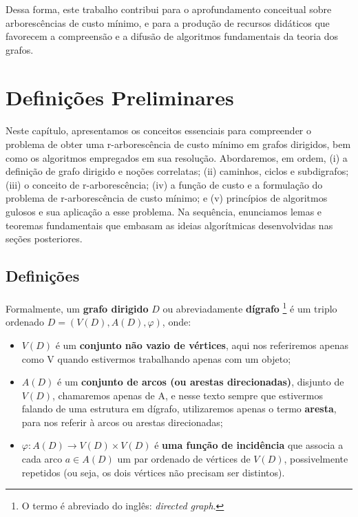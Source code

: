 \documentclass[12pt,a4paper]{article}
\begin{document}
Dessa forma, este trabalho contribui para o aprofundamento conceitual sobre arborescências de custo mínimo, e para a produção de recursos didáticos que favorecem a compreensão e a difusão de algoritmos fundamentais da teoria dos grafos.

\section{Definições Preliminares}
\paragraph{}
Neste capítulo, apresentamos os conceitos essenciais para compreender o problema de obter uma r-arborescência de custo mínimo em grafos dirigidos, bem como os algoritmos empregados em sua resolução. Abordaremos, em ordem, (i) a definição de grafo dirigido e noções correlatas; (ii) caminhos, ciclos e subdigrafos; (iii) o conceito de r-arborescência; (iv) a função de custo e a formulação do problema de r-arborescência de custo mínimo; e (v) princípios de algoritmos gulosos e sua aplicação a esse problema. Na sequência, enunciamos lemas e teoremas fundamentais que embasam as ideias algorítmicas desenvolvidas nas seções posteriores.

\subsection{Definições}
\paragraph{}
Formalmente, um \textbf{grafo dirigido} \(D\) ou abreviadamente \textbf{dígrafo} 
\footnote{O termo é abreviado do inglês: \textit{directed graph}.} é um triplo ordenado \(D = (V(D), A(D), \varphi)\), onde:
\begin{itemize}
    \item \(V(D)\) é um \textbf{conjunto não vazio de vértices}, aqui nos referiremos apenas como V quando estivermos trabalhando apenas com um objeto;
    \item \(A(D)\) é um \textbf{conjunto de arcos (ou arestas direcionadas)}, disjunto de \(V(D)\), chamaremos apenas de A, e nesse texto sempre que estivermos falando de uma estrutura em dígrafo, utilizaremos apenas o termo \textbf{aresta}, para nos referir à arcos ou arestas direcionadas;
    \item \(\varphi: A(D) \to V(D) \times V(D)\) é \textbf{uma função de incidência} que associa a cada arco \(a \in A(D)\) um par ordenado de vértices de \(V(D)\), possivelmente repetidos (ou seja, os dois vértices não precisam ser distintos).
\end{itemize}
\end{document}
